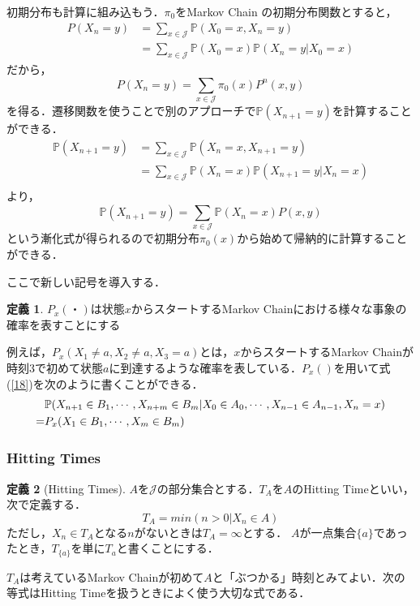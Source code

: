 \documentclass[12pt, a4paper]{jsarticle}
\theoremstyle{definition}
\newtheorem{defn}{定義}[section]
\begin{document}
初期分布も計算に組み込もう．$\pi_0$をMarkov Chain の初期分布関数とすると，
\begin{align*}
	P(X_n = y) &= \sum_{x \in \mathcal{J}}\mathbb{P} (X_0 = x, X_n = y) \\
	&= \sum_{x \in \mathcal{J}} \mathbb{P}(X_0 = x) \mathbb{P}(X_n = y | X_0 = x)
\end{align*}
だから，
\begin{equation}
	P(X_n = y) = \sum_{x \in \mathcal{J}} \pi_0(x) P^n(x,y) \label{24}
\end{equation}
を得る．遷移関数を使うことで別のアプローチで$\mathbb{P}(X_{n+1} = y)$を計算することができる．
\begin{align*}
\mathbb{P}(X_{n+1} = y) &= \sum_{x \in \mathcal{J}} \mathbb{P}(X_n = x, X_{n+1} = y) \\
&= \sum_{x \in \mathcal{J}} \mathbb{P}(X_n = x)\mathbb{P}(X_{n+1} = y | X_n = x) \\
\end{align*}
より，
\begin{equation}
\mathbb{P}(X_{n+1} = y) = \sum_{x \in \mathcal{J}} \mathbb{P}(X_n = x) P(x,y) \label{25}
\end{equation}
という漸化式が得られるので初期分布$\pi_0(x)$から始めて帰納的に計算することができる．

ここで新しい記号を導入する．
\begin{screen}
	\begin{defn}
	$P_x (・)$は状態$x$からスタートするMarkov Chainにおける様々な事象の確率を表すことにする
	\end{defn}
\end{screen}
例えば，$P_x(X_1 \neq a,X_2 \neq a,X_3 = a)$とは，$x$からスタートするMarkov Chainが時刻3で初めて状態$a$に到達するような確率を表している．$P_x()$を用いて式(\ref{18})を次のように書くことができる．
\begin{align}
&\mathbb{P}(X_{n+1} \in B_1, \cdots,X_{n+m} \in B_m | X_0 \in A_0 ,\cdots,X_{n-1} \in A_{n-1}, X_n = x) \notag \\
 = &P_x(X_1 \in B_1,\cdots, X_m \in B_m) \label{26}
\end{align}
\subsubsection{Hitting Times}
\begin{screen}
\begin{defn}[Hitting Times]
$A$を$\mathcal{J}$の部分集合とする．$T_A$を$A$のHitting Timeといい，次で定義する．
\[T_A = min(n > 0 | X_n \in A)\]
ただし，$X_n \in T_A$となる$n$がないときは$T_A = \infty$とする．
$A$が一点集合$\{a\}$であったとき，$T_{\{a\}}$を単に$T_a$と書くことにする．
\end{defn}
\end{screen}
$T_A$は考えているMarkov Chainが初めて$A$と「ぶつかる」時刻とみてよい．次の等式はHitting Timeを扱うときによく使う大切な式である．
\end{document}
